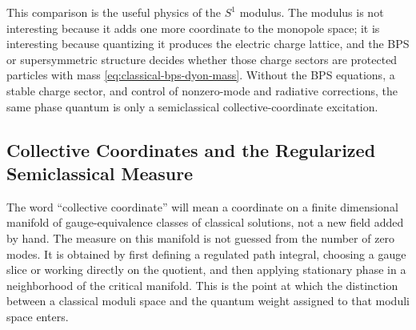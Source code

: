 \begin{controlledapproximation}
This comparison is the useful physics of the \(S^1\) modulus.  The modulus is
not interesting because it adds one more coordinate to the monopole space; it
is interesting because quantizing it produces the electric charge lattice, and
the BPS or supersymmetric structure decides whether those charge sectors are
protected particles with mass \eqref{eq:classical-bps-dyon-mass}.  Without the
BPS equations, a stable charge sector, and control of nonzero-mode and
radiative corrections, the same phase quantum is only a semiclassical
collective-coordinate excitation.
\end{controlledapproximation}

\subsection{Collective Coordinates and the Regularized Semiclassical Measure}
\label{subsec:collective-coordinate-regularized-measure}

The word ``collective coordinate'' will mean a coordinate on a finite
dimensional manifold of gauge-equivalence classes of classical solutions,
not a new field added by hand.  The measure on this manifold is not guessed
from the number of zero modes.  It is obtained by first defining a regulated
path integral, choosing a gauge slice or working directly on the quotient,
and then applying stationary phase in a neighborhood of the critical
manifold.  This is the point at which the distinction between a classical
moduli space and the quantum weight assigned to that moduli space enters.

